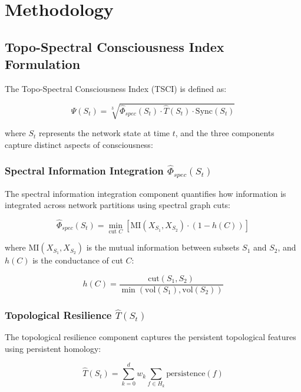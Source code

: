 \documentclass[conference]{IEEEtran}
\begin{document}
\section{Methodology}

\subsection{Topo-Spectral Consciousness Index Formulation}

The Topo-Spectral Consciousness Index (TSCI) is defined as:

\begin{equation}
\Psi(S_t) = \sqrt[3]{\hat{\Phi}_{spec}(S_t) \cdot \hat{T}(S_t) \cdot \text{Sync}(S_t)}
\label{eq:tsci}
\end{equation}

where $S_t$ represents the network state at time $t$, and the three components capture distinct aspects of consciousness:

\subsubsection{Spectral Information Integration $\hat{\Phi}_{spec}(S_t)$}

The spectral information integration component quantifies how information is integrated across network partitions using spectral graph cuts:

\begin{equation}
\hat{\Phi}_{spec}(S_t) = \min_{\text{cut } C} \left[ \text{MI}(X_{S_1}, X_{S_2}) \cdot (1 - h(C)) \right]
\label{eq:phi_spec}
\end{equation}

where $\text{MI}(X_{S_1}, X_{S_2})$ is the mutual information between subsets $S_1$ and $S_2$, and $h(C)$ is the conductance of cut $C$:

\begin{equation}
h(C) = \frac{\text{cut}(S_1, S_2)}{\min(\text{vol}(S_1), \text{vol}(S_2))}
\label{eq:conductance}
\end{equation}

\subsubsection{Topological Resilience $\hat{T}(S_t)$}

The topological resilience component captures the persistent topological features using persistent homology:

\begin{equation}
\hat{T}(S_t) = \sum_{k=0}^{d} w_k \sum_{f \in H_k} \text{persistence}(f)
\label{eq:topological_resilience}
\end{equation}
\end{document}
